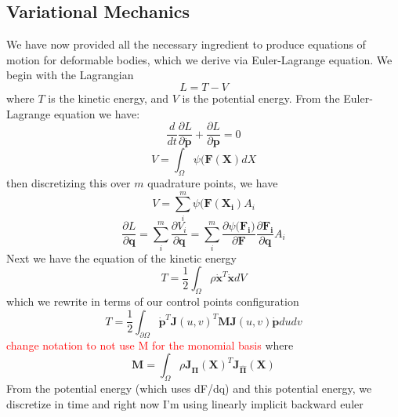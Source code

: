 \documentclass[sigconf]{acmart}
\newcommand\myworries[1]{\textcolor{red}{#1}}
\begin{document}
\subsection{Variational Mechanics}
We have now provided all the necessary ingredient to produce equations of motion for deformable bodies, which we derive via Euler-Lagrange equation. We begin with the Lagrangian
\begin{equation}
    L=T-V
\end{equation}
where $T$ is the kinetic energy, and $V$ is the potential energy. From the Euler-Lagrange equation we have:
\begin{equation}
    \frac{d}{dt} \frac{\partial L}{\partial \dot{\mathbf{p}}} + \frac{\partial L}{\partial {\mathbf{p}}} = 0
\end{equation}
\begin{equation}
    V =  \int_\Omega \psi(\mathbf{F(X)} dX
\end{equation}
then discretizing this over $m$ quadrature points, we have
\begin{equation}
    V =  \sum_i^m \psi(\mathbf{F(X_i)} A_i
\end{equation}
\begin{equation}
    \frac{\partial L}{\partial \mathbf{q}} = \sum_i^m \frac{\partial V_i}{\partial \mathbf{q}} = \sum_i^m \frac{\partial \psi(\mathbf{F_i)}}{\partial \mathbf{F}}\frac{\partial \mathbf{F_i}}{\partial \mathbf{q}}A_i
\end{equation}
Next we have the equation of the kinetic energy
\begin{equation}
    T = \frac{1}{2}\int_{ \Omega} \rho \dot{\mathbf{x}}^T\dot{\mathbf{x}} dV
\end{equation}
which we rewrite in terms of our control points configuration
\begin{equation}
    T = \frac{1}{2} \int_{\partial \Omega} \dot{\mathbf{p}}^T \mathbf{J}(u,v)^T \mathbf{M} \mathbf{J}(u,v) \dot{\mathbf{p}} du dv
\end{equation}
\myworries{change notation to not use M for the monomial basis}
where
\begin{equation}
    \mathbf{M} = \int_\Omega \rho \mathbf{J_{\hat{\Pi}}(X)}^T \mathbf{J_{\hat{\Pi}}(X)}
\end{equation}
From the potential energy (which uses dF/dq) and this potential energy, we discretize in time and right now I'm using linearly implicit backward euler
\end{document}
